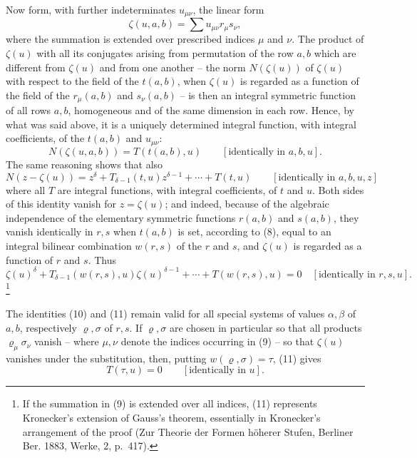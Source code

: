 Now form, with further indeterminates $u_{\mu\nu}$, the linear form
\begin{equation}
 \zeta(u,a,b)=\sum u_{\mu\nu}r_\mu s_\nu,
\tag{9}
\end{equation}
where the summation is extended over prescribed indices $\mu$ and $\nu$. The product of $\zeta(u)$ with all its conjugates arising from permutation of the row $a,b$ which are different from $\zeta(u)$ and from one another -- the norm $N(\zeta(u))$ of $\zeta(u)$ with respect to the field of the $t(a,b)$, when $\zeta(u)$ is regarded as a function of the field of the $r_\mu(a,b)$ and $s_\nu(a,b)$ -- is then an integral symmetric function of all rows $a,b$, homogeneous and of the same dimension in each row. Hence, by what was said above, it is a uniquely determined integral function, with integral coefficients, of the $t(a,b)$ and $u_{\mu\nu}$:
\begin{equation}
 N(\zeta(u,a,b))=T(t(a,b),u)\qquad[\text{identically in }a,b,u].
\tag{10}
\end{equation}
The same reasoning shows that also
\[
N(z-\zeta(u))=z^\delta+T_{\delta-1}(t,u)z^{\delta-1}+\cdots+T(t,u)
\qquad[\text{identically in }a,b,u,z]
\]
where all $T$ are integral functions, with integral coefficients, of $t$ and $u$. Both sides of this identity vanish for $z=\zeta(u)$; and indeed, because of the algebraic independence of the elementary symmetric functions $r(a,b)$ and $s(a,b)$, they vanish identically in $r,s$ when $t(a,b)$ is set, according to (8), equal to an integral bilinear combination $w(r,s)$ of the $r$ and $s$, and $\zeta(u)$ is regarded as a function of $r$ and $s$. Thus
\begin{equation}
\zeta(u)^\delta+T_{\delta-1}(w(r,s),u)\zeta(u)^{\delta-1}+\cdots+T(w(r,s),u)=0
\quad[\text{identically in }r,s,u].
\tag{11}
\end{equation}\footnote{If the summation in (9) is extended over all indices, (11) represents Kronecker's extension of Gauss's theorem, essentially in Kronecker's arrangement of the proof (Zur Theorie der Formen höherer Stufen, Berliner Ber. 1883, Werke, 2, p.~417).}

The identities (10) and (11) remain valid for all special systems of values $\alpha,\beta$ of $a,b$, respectively $\varrho,\sigma$ of $r,s$. If $\varrho,\sigma$ are chosen in particular so that all products $\varrho_\mu\sigma_\nu$ vanish -- where $\mu,\nu$ denote the indices occurring in (9) -- so that $\zeta(u)$ vanishes under the substitution, then, putting $w(\varrho,\sigma)=\tau$, (11) gives
\begin{equation}
 T(\tau,u)=0\qquad[\text{identically in }u].
\tag{12}
\end{equation}

